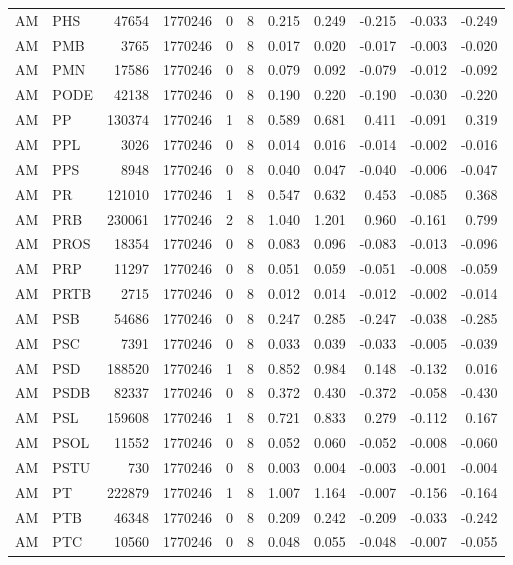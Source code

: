 \begin{landscape}
\begin{longtable}{llrrrrrrrrr}
AM & PHS & 47654 & 1770246 & 0 & 8 & 0.215 & 0.249 & -0.215 & -0.033 & -0.249 \\
AM & PMB & 3765 & 1770246 & 0 & 8 & 0.017 & 0.020 & -0.017 & -0.003 & -0.020 \\
AM & PMN & 17586 & 1770246 & 0 & 8 & 0.079 & 0.092 & -0.079 & -0.012 & -0.092 \\
AM & PODE & 42138 & 1770246 & 0 & 8 & 0.190 & 0.220 & -0.190 & -0.030 & -0.220 \\
AM & PP & 130374 & 1770246 & 1 & 8 & 0.589 & 0.681 & 0.411 & -0.091 & 0.319 \\
AM & PPL & 3026 & 1770246 & 0 & 8 & 0.014 & 0.016 & -0.014 & -0.002 & -0.016 \\
AM & PPS & 8948 & 1770246 & 0 & 8 & 0.040 & 0.047 & -0.040 & -0.006 & -0.047 \\
AM & PR & 121010 & 1770246 & 1 & 8 & 0.547 & 0.632 & 0.453 & -0.085 & 0.368 \\
AM & PRB & 230061 & 1770246 & 2 & 8 & 1.040 & 1.201 & 0.960 & -0.161 & 0.799 \\
AM & PROS & 18354 & 1770246 & 0 & 8 & 0.083 & 0.096 & -0.083 & -0.013 & -0.096 \\
AM & PRP & 11297 & 1770246 & 0 & 8 & 0.051 & 0.059 & -0.051 & -0.008 & -0.059 \\
AM & PRTB & 2715 & 1770246 & 0 & 8 & 0.012 & 0.014 & -0.012 & -0.002 & -0.014 \\
AM & PSB & 54686 & 1770246 & 0 & 8 & 0.247 & 0.285 & -0.247 & -0.038 & -0.285 \\
AM & PSC & 7391 & 1770246 & 0 & 8 & 0.033 & 0.039 & -0.033 & -0.005 & -0.039 \\
AM & PSD & 188520 & 1770246 & 1 & 8 & 0.852 & 0.984 & 0.148 & -0.132 & 0.016 \\
AM & PSDB & 82337 & 1770246 & 0 & 8 & 0.372 & 0.430 & -0.372 & -0.058 & -0.430 \\
AM & PSL & 159608 & 1770246 & 1 & 8 & 0.721 & 0.833 & 0.279 & -0.112 & 0.167 \\
AM & PSOL & 11552 & 1770246 & 0 & 8 & 0.052 & 0.060 & -0.052 & -0.008 & -0.060 \\
AM & PSTU & 730 & 1770246 & 0 & 8 & 0.003 & 0.004 & -0.003 & -0.001 & -0.004 \\
AM & PT & 222879 & 1770246 & 1 & 8 & 1.007 & 1.164 & -0.007 & -0.156 & -0.164 \\
AM & PTB & 46348 & 1770246 & 0 & 8 & 0.209 & 0.242 & -0.209 & -0.033 & -0.242 \\
AM & PTC & 10560 & 1770246 & 0 & 8 & 0.048 & 0.055 & -0.048 & -0.007 & -0.055 \\

\end{longtable}
\end{landscape}
